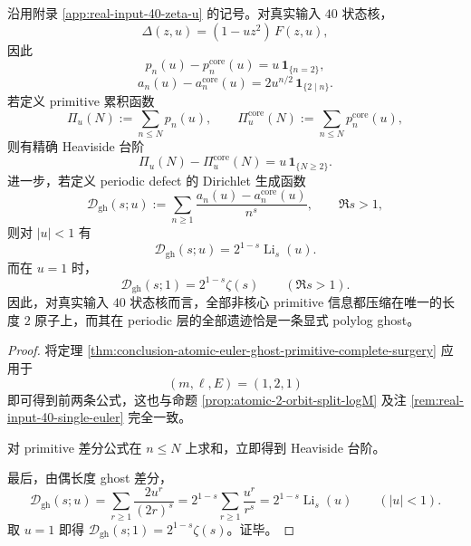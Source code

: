 \begin{corollary}\label{cor:conclusion-realinput40-even-defect-polylog-ghost}
沿用附录 \ref{app:real-input-40-zeta-u} 的记号。对真实输入 \(40\) 状态核，
\[
\Delta(z,u)=(1-uz^2)\,F(z,u),
\]
因此
\[
\boxed{\;
p_n(u)-p_n^{\mathrm{core}}(u)
=
u\,\mathbf 1_{\{n=2\}},\;}
\]
\[
\boxed{\;
a_n(u)-a_n^{\mathrm{core}}(u)
=
2u^{n/2}\,\mathbf 1_{\{2\mid n\}}.\;}
\]
若定义 primitive 累积函数
\[
\Pi_u(N):=\sum_{n\le N}p_n(u),
\qquad
\Pi_u^{\mathrm{core}}(N):=\sum_{n\le N}p_n^{\mathrm{core}}(u),
\]
则有精确 Heaviside 台阶
\[
\boxed{\;
\Pi_u(N)-\Pi_u^{\mathrm{core}}(N)
=
u\,\mathbf 1_{\{N\ge 2\}}.\;}
\]
进一步，若定义 periodic defect 的 Dirichlet 生成函数
\[
\mathcal D_{\mathrm{gh}}(s;u)
:=
\sum_{n\ge 1}\frac{a_n(u)-a_n^{\mathrm{core}}(u)}{n^s},
\qquad
\Re s>1,
\]
则对 \(|u|<1\) 有
\[
\boxed{\;
\mathcal D_{\mathrm{gh}}(s;u)=2^{1-s}\operatorname{Li}_s(u).\;}
\]
而在 \(u=1\) 时，
\[
\boxed{\;
\mathcal D_{\mathrm{gh}}(s;1)=2^{1-s}\zeta(s)
\qquad (\Re s>1).\;}
\]
因此，对真实输入 \(40\) 状态核而言，全部非核心 primitive 信息都压缩在唯一的长度 \(2\) 原子上，而其在 periodic 层的全部遗迹恰是一条显式 polylog ghost。
\end{corollary}
\begin{proof}
将定理 \ref{thm:conclusion-atomic-euler-ghost-primitive-complete-surgery} 应用于
\[
(m,\ell,E)=(1,2,1)
\]
即可得到前两条公式，这也与命题 \ref{prop:atomic-2-orbit-split-logM} 及注 \ref{rem:real-input-40-single-euler} 完全一致。

对 primitive 差分公式在 \(n\le N\) 上求和，立即得到 Heaviside 台阶。

最后，由偶长度 ghost 差分，
\[
\mathcal D_{\mathrm{gh}}(s;u)
=
\sum_{r\ge 1}\frac{2u^r}{(2r)^s}
=
2^{1-s}\sum_{r\ge 1}\frac{u^r}{r^s}
=
2^{1-s}\operatorname{Li}_s(u)
\qquad (|u|<1).
\]
取 \(u=1\) 即得 \(\mathcal D_{\mathrm{gh}}(s;1)=2^{1-s}\zeta(s)\)。证毕。
\end{proof}

